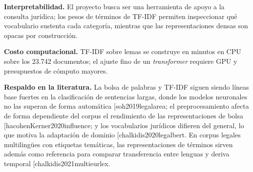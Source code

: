 \documentclass[11pt]{tg_usta}
\makeatletter
\renewcommand{\cite}{\@ifnextchar[{\@tempswatrue\@citex}{\@tempswafalse\@citex[]}}
\makeatother
\begin{document}
\textbf{Interpretabilidad.} El proyecto busca ser una herramienta de apoyo a la consulta jurídica; los pesos de términos de TF-IDF permiten inspeccionar qué vocabulario sustenta cada categoría, mientras que las representaciones densas son opacas por construcción.

\textbf{Costo computacional.} TF-IDF sobre lemas se construye en minutos en CPU sobre los 23.742 documentos; el ajuste fino de un \emph{transformer} requiere GPU y presupuestos de cómputo mayores.

\textbf{Respaldo en la literatura.} La bolsa de palabras y TF-IDF siguen siendo líneas base fuertes en la clasificación de sentencias largas, donde los modelos neuronales no las superan de forma automática \cite{soh2019legalarea}; el preprocesamiento afecta de forma dependiente del corpus el rendimiento de las representaciones de bolsa \cite{hacohenKerner2020influence}; y los vocabularios jurídicos difieren del general, lo que motiva la adaptación de dominio \cite{chalkidis2020legalbert}. En corpus legales multilingües con etiquetas temáticas, las representaciones de términos sirven además como referencia para comparar transferencia entre lenguas y deriva temporal \cite{chalkidis2021multieurlex}.
\end{document}
